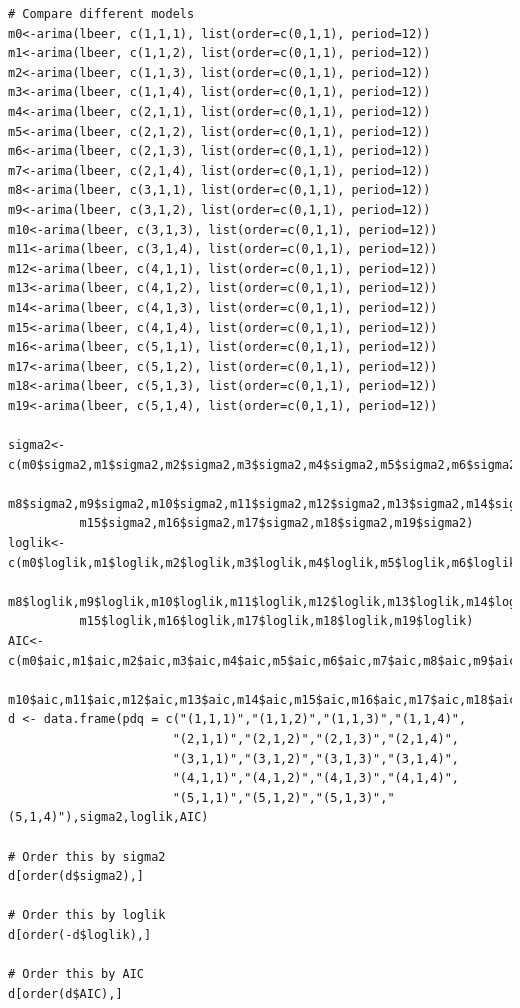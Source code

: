 \documentclass[]{article}
\begin{document}
\begin{Verbatim}[frame=single]
# Compare different models
m0<-arima(lbeer, c(1,1,1), list(order=c(0,1,1), period=12))
m1<-arima(lbeer, c(1,1,2), list(order=c(0,1,1), period=12))
m2<-arima(lbeer, c(1,1,3), list(order=c(0,1,1), period=12))
m3<-arima(lbeer, c(1,1,4), list(order=c(0,1,1), period=12))
m4<-arima(lbeer, c(2,1,1), list(order=c(0,1,1), period=12))
m5<-arima(lbeer, c(2,1,2), list(order=c(0,1,1), period=12))
m6<-arima(lbeer, c(2,1,3), list(order=c(0,1,1), period=12))
m7<-arima(lbeer, c(2,1,4), list(order=c(0,1,1), period=12))
m8<-arima(lbeer, c(3,1,1), list(order=c(0,1,1), period=12))
m9<-arima(lbeer, c(3,1,2), list(order=c(0,1,1), period=12))
m10<-arima(lbeer, c(3,1,3), list(order=c(0,1,1), period=12))
m11<-arima(lbeer, c(3,1,4), list(order=c(0,1,1), period=12))
m12<-arima(lbeer, c(4,1,1), list(order=c(0,1,1), period=12))
m13<-arima(lbeer, c(4,1,2), list(order=c(0,1,1), period=12))
m14<-arima(lbeer, c(4,1,3), list(order=c(0,1,1), period=12))
m15<-arima(lbeer, c(4,1,4), list(order=c(0,1,1), period=12))
m16<-arima(lbeer, c(5,1,1), list(order=c(0,1,1), period=12))
m17<-arima(lbeer, c(5,1,2), list(order=c(0,1,1), period=12))
m18<-arima(lbeer, c(5,1,3), list(order=c(0,1,1), period=12))
m19<-arima(lbeer, c(5,1,4), list(order=c(0,1,1), period=12))

sigma2<-c(m0$sigma2,m1$sigma2,m2$sigma2,m3$sigma2,m4$sigma2,m5$sigma2,m6$sigma2,m7$sigma2,
          m8$sigma2,m9$sigma2,m10$sigma2,m11$sigma2,m12$sigma2,m13$sigma2,m14$sigma2,
          m15$sigma2,m16$sigma2,m17$sigma2,m18$sigma2,m19$sigma2)
loglik<-c(m0$loglik,m1$loglik,m2$loglik,m3$loglik,m4$loglik,m5$loglik,m6$loglik,m7$loglik,
          m8$loglik,m9$loglik,m10$loglik,m11$loglik,m12$loglik,m13$loglik,m14$loglik,
          m15$loglik,m16$loglik,m17$loglik,m18$loglik,m19$loglik)
AIC<-c(m0$aic,m1$aic,m2$aic,m3$aic,m4$aic,m5$aic,m6$aic,m7$aic,m8$aic,m9$aic,
       m10$aic,m11$aic,m12$aic,m13$aic,m14$aic,m15$aic,m16$aic,m17$aic,m18$aic,m19$aic)
d <- data.frame(pdq = c("(1,1,1)","(1,1,2)","(1,1,3)","(1,1,4)",
                       "(2,1,1)","(2,1,2)","(2,1,3)","(2,1,4)",
                       "(3,1,1)","(3,1,2)","(3,1,3)","(3,1,4)",
                       "(4,1,1)","(4,1,2)","(4,1,3)","(4,1,4)",
                       "(5,1,1)","(5,1,2)","(5,1,3)","(5,1,4)"),sigma2,loglik,AIC)

# Order this by sigma2
d[order(d$sigma2),]

# Order this by loglik
d[order(-d$loglik),]

# Order this by AIC
d[order(d$AIC),]
\end{Verbatim}
\end{document}
